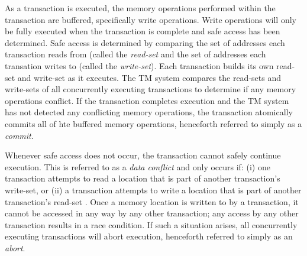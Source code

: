 \documentclass[11pt]{book}
\begin{document}

As a transaction is executed, the memory operations performed within the
transaction are buffered, specifically write operations.  Write operations will
only be fully executed when the transaction is complete and safe access has been
determined.  Safe access is determined by comparing the set of addresses each
transaction reads from  (called the \emph{read-set} and the set of addresses
each transation writes to (called the \emph{write-set}).  Each transaction
builds its own read-set and write-set as it executes.  The TM system compares the read-sets and
write-sets of all concurrently executing transactions to determine if any memory
operations conflict.  If the transaction completes execution and the TM system
has not detected any conflicting memory operations, the transaction atomically
commits all of hte buffered memory operations, henceforth referred to simply as
a \emph{commit}.

Whenever safe access does not occur, the transaction cannot safely continue execution.
This is referred to as a \emph{data conflict} and only occurs if: (i) one
transaction attempts to read a location that is part of another transaction's write-set, 
or (ii) a transaction attempts to write a location that is part of another transaction's
read-set \cite{intel_prog_ref}.  Once a memory location is written to by a 
transaction, it cannot be accessed in any way by any other transaction; any
access by any other transaction results in a race condition.  If such a
situation arises, all concurrently executing transactions will abort execution,
henceforth referred to simply as an \emph{abort}.
\end{document}
